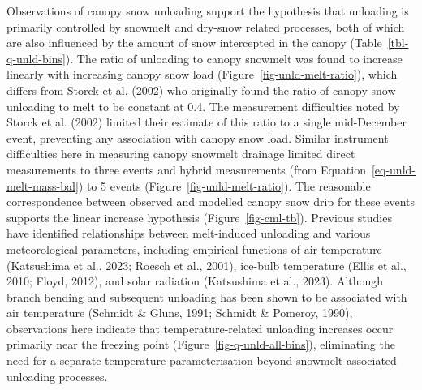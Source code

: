 \documentclass[
  letterpaper,
]{tex/uofsthesis-cs}
\begin{document}
Observations of canopy snow unloading support the hypothesis that
unloading is primarily controlled by snowmelt and dry-snow related
processes, both of which are also influenced by the amount of snow
intercepted in the canopy (Table~\ref{tbl-q-unld-bins}). The ratio of
unloading to canopy snowmelt was found to increase linearly with
increasing canopy snow load (Figure~\ref{fig-unld-melt-ratio}), which
differs from Storck et al. (2002) who originally found the ratio of
canopy snow unloading to melt to be constant at 0.4. The measurement
difficulties noted by Storck et al. (2002) limited their estimate of
this ratio to a single mid-December event, preventing any association
with canopy snow load. Similar instrument difficulties here in measuring
canopy snowmelt drainage limited direct measurements to three events and
hybrid measurements (from Equation~\ref{eq-unld-melt-mass-bal}) to 5
events (Figure~\ref{fig-unld-melt-ratio}). The reasonable correspondence
between observed and modelled canopy snow drip for these events supports
the linear increase hypothesis (Figure~\ref{fig-cml-tb}). Previous
studies have identified relationships between melt-induced unloading and
various meteorological parameters, including empirical functions of air
temperature (Katsushima et al., 2023; Roesch et al., 2001), ice-bulb
temperature (Ellis et al., 2010; Floyd, 2012), and solar radiation
(Katsushima et al., 2023). Although branch bending and subsequent
unloading has been shown to be associated with air temperature (Schmidt
\& Gluns, 1991; Schmidt \& Pomeroy, 1990), observations here indicate
that temperature-related unloading increases occur primarily near the
freezing point (Figure~\ref{fig-q-unld-all-bins}), eliminating the need
for a separate temperature parameterisation beyond snowmelt-associated
unloading processes.
\end{document}
